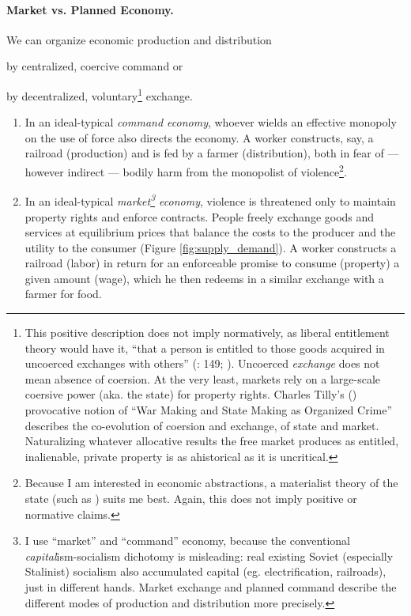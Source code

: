 \paragraph{Market vs. Planned Economy.} \label{sec:market_vs_command} We can organize economic production and distribution \begin{inparaenum}[1)] 
		\item by centralized, coercive command or
		\item by decentralized, voluntary\footnote{
				\label{fn:tilly}This positive description does not imply normatively, as liberal entitlement theory would have it, ``that a person is entitled to those goods acquired in uncoerced exchanges with others'' (\citealt{Nozick1974}: 149; \citealt{Friedman1962}). Uncoerced \emph{exchange} does not mean absence of coersion. At the very least, markets rely on a large-scale coersive power (aka. the state) for property rights. Charles Tilly's (\citeyear{Tilly-1985-aa}) provocative notion of ``War Making and State Making as Organized Crime'' describes the co-evolution of coersion and exchange, of state and market. Naturalizing whatever allocative results the free market produces as entitled, inalienable, private property is as ahistorical as it is uncritical.} 
			exchange. \end{inparaenum} 
	\begin{enumerate}
		\item In an ideal-typical \cite{Weber-1920-aa} \emph{command economy}, whoever wields an effective monopoly on the use of force also directs the economy. A worker constructs, say, a railroad (production) and is fed by a farmer (distribution), both in fear of --- however indirect --- bodily harm from the monopolist of violence\footnote{
				Because I am  interested in economic abstractions, a materialist theory of the state (such as \citealt{Tilly-1985-aa}) suits me best. Again, this does not imply positive or normative claims.}. 
		\item In an ideal-typical \emph{market\footnote{
				I use ``market'' and ``command'' economy, because the conventional \emph{capital}ism-socialism dichotomy is misleading: real existing Soviet (especially Stalinist) socialism also accumulated capital (eg. electrification, railroads), just in different hands. Market exchange and planned command describe the different modes of production and distribution more precisely.} 
			economy}, violence is threatened only to maintain property rights and enforce contracts. People freely exchange goods and services at equilibrium prices that balance the costs to the producer and the utility to the consumer (Figure \ref{fig:supply_demand}).  A worker constructs a railroad (labor) in return for an enforceable promise to consume (property) a given amount (wage), which he then redeems in a similar exchange with a farmer for food. 
	\end{enumerate}

